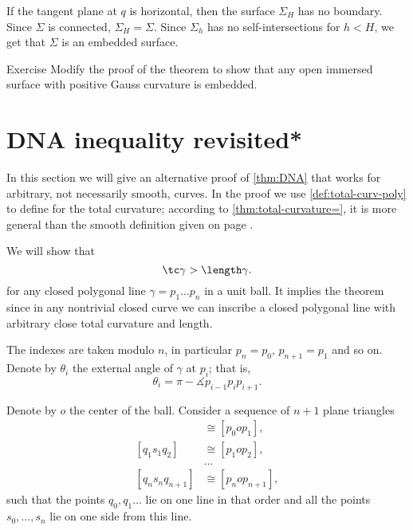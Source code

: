 If the tangent plane at $q$ is horizontal,
then the surface $\Sigma_H$ has no boundary.
Since $\Sigma$ is connected, $\Sigma_H=\Sigma$.
Since $\Sigma_h$ has no self-intersections for $h<H$, we get that $\Sigma$ is an embedded surface.
\qeds

\begin{thm}{Exercise}
Modify the proof of the theorem to show that any open immersed surface with positive Gauss curvature is embedded.
\end{thm}




























\section*{DNA inequality revisited*}

In this section we will give an alternative proof of \ref{thm:DNA} that works for arbitrary, not necessarily smooth, curves.
In the proof we use \ref{def:total-curv-poly} to define for the total curvature;
according to \ref{thm:total-curvature=}, it is more general than the smooth definition given on page \pageref{page:total curvature of:smooth-def}.

We will show that 
\[\tc\gamma> \length\gamma.\]
for any closed polygonal line $\gamma=p_1\dots p_{n}$ in a unit ball.
It implies the theorem since in any nontrivial closed curve we can inscribe a closed polygonal line with arbitrary close total curvature and length.

The indexes are taken modulo $n$, in particular $p_{n}=p_0$, $p_{n+1}=p_1$ and so on.
Denote by $\theta_i$ the external angle of $\gamma$ at $p_i$;
that is,
\[\theta_i=\pi-\measuredangle p_{i-1}p_ip_{i+1}.\]

Denote by $o$ the center of the ball.
Consider a sequence of $n+1$ plane triangles
\begin{align*}
[q_0s_0q_1]
&\cong 
[p_0op_1],
\\
[q_1s_1q_2]
&\cong 
[p_1op_2],
\\
&\dots
\\
[q_{n}s_nq_{n+1}]
&\cong 
[p_nop_{n+1}],
\end{align*}
such that the points $q_0,q_1\dots$ lie on one line in that order and all the points $s_0,\dots,s_n$ lie on one side from this line.

